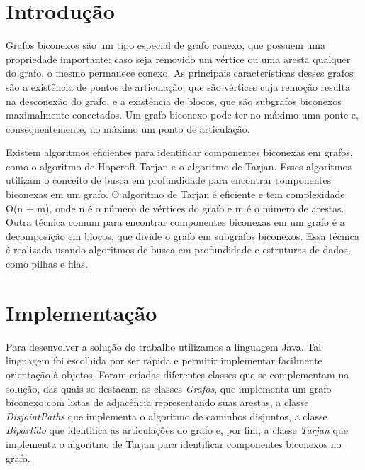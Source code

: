 \section{\esp Introdução}

Grafos biconexos são um tipo especial de grafo conexo, que possuem uma propriedade importante: caso seja removido um vértice ou uma aresta qualquer do grafo, o mesmo permanece conexo. As principais características desses grafos são a existência de pontos de articulação, que são vértices cuja remoção resulta na desconexão do grafo, e a existência de blocos, que são subgrafos biconexos maximalmente conectados. Um grafo biconexo pode ter no máximo uma ponte e, consequentemente, no máximo um ponto de articulação.


Existem algoritmos eficientes para identificar componentes biconexas em grafos, como o algoritmo de Hopcroft-Tarjan e o algoritmo de Tarjan. Esses algoritmos utilizam o conceito de busca em profundidade para encontrar componentes biconexas em um grafo. O algoritmo de Tarjan é eficiente e tem complexidade O(n + m), onde n é o número de vértices do grafo e m é o número de arestas. Outra técnica comum para encontrar componentes biconexas em um grafo é a decomposição em blocos, que divide o grafo em subgrafos biconexos. Essa técnica é realizada usando algoritmos de busca em profundidade e estruturas de dados, como pilhas e filas.


\section{\esp Implementação}
Para desenvolver a solução do trabalho utilizamos a linguagem Java. Tal linguagem foi escolhida por ser rápida e permitir implementar facilmente orientação à objetos.
Foram criadas diferentes classes que se complementam na solução, das quais se destacam as classes \textit{Grafos}, que implementa um grafo biconexo com listas de adjacência representando suas arestas, a classe \textit{DisjointPaths} que implementa o algoritmo de caminhos disjuntos, a classe \textit{Bipartido} que identifica as articulações do grafo e, por fim, a classe \textit{Tarjan} que implementa o algoritmo de Tarjan para identificar componentes biconexos no grafo. 

